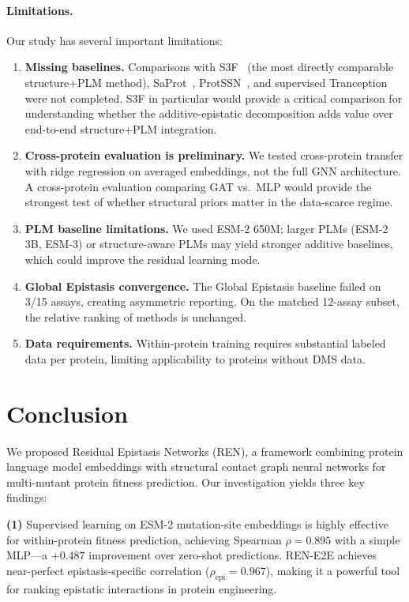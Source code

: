 \documentclass{article}
\newcommand{\ren}{\textsc{REN}}
\newcommand{\rene}{\textsc{REN-E2E}}
\begin{document}
\paragraph{Limitations.}
Our study has several important limitations:
\begin{enumerate}
    \item \textbf{Missing baselines.} Comparisons with S3F~\citep{zhang2024multiscale} (the most directly comparable structure+PLM method), SaProt~\citep{su2024saprot}, ProtSSN~\citep{tan2023semantical}, and supervised Tranception~\citep{notin2022tranception} were not completed. S3F in particular would provide a critical comparison for understanding whether the additive-epistatic decomposition adds value over end-to-end structure+PLM integration.
    \item \textbf{Cross-protein evaluation is preliminary.} We tested cross-protein transfer with ridge regression on averaged embeddings, not the full GNN architecture. A cross-protein evaluation comparing GAT vs.\ MLP would provide the strongest test of whether structural priors matter in the data-scarce regime.
    \item \textbf{PLM baseline limitations.} We used ESM-2 650M; larger PLMs (ESM-2 3B, ESM-3) or structure-aware PLMs may yield stronger additive baselines, which could improve the residual learning mode.
    \item \textbf{Global Epistasis convergence.} The Global Epistasis baseline failed on 3/15 assays, creating asymmetric reporting. On the matched 12-assay subset, the relative ranking of methods is unchanged.
    \item \textbf{Data requirements.} Within-protein training requires substantial labeled data per protein, limiting applicability to proteins without DMS data.
\end{enumerate}

\section{Conclusion}
\label{sec:conclusion}

We proposed Residual Epistasis Networks (\ren{}), a framework combining protein language model embeddings with structural contact graph neural networks for multi-mutant protein fitness prediction. Our investigation yields three key findings:

\textbf{(1)} Supervised learning on ESM-2 mutation-site embeddings is highly effective for within-protein fitness prediction, achieving Spearman $\rho = 0.895$ with a simple MLP---a $+0.487$ improvement over zero-shot predictions. \rene{} achieves near-perfect epistasis-specific correlation ($\rho_\text{epi} = 0.967$), making it a powerful tool for ranking epistatic interactions in protein engineering.
\end{document}
